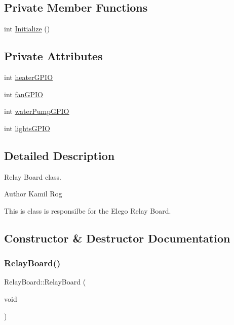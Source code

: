 \subsection*{Private Member Functions}
\begin{DoxyCompactItemize}
\item 
int \hyperlink{classRelayBoard_a49759cb3cdcb6c2ccd7fbb44eb34b260}{Initialize} ()
\end{DoxyCompactItemize}
\subsection*{Private Attributes}
\begin{DoxyCompactItemize}
\item 
int \hyperlink{classRelayBoard_a714832d9e7129960e0413b5618d2e310}{heater\+G\+P\+IO}
\item 
int \hyperlink{classRelayBoard_a70ab1391ffac8f4c01c64ba1a811b6fc}{fan\+G\+P\+IO}
\item 
int \hyperlink{classRelayBoard_a195c50d455165712f59cd39c6f7a6b82}{water\+Pump\+G\+P\+IO}
\item 
int \hyperlink{classRelayBoard_a05f68a6555288127a238e31282886ae0}{lights\+G\+P\+IO}
\end{DoxyCompactItemize}


\subsection{Detailed Description}
Relay Board class. 

\begin{DoxyAuthor}{Author}
Kamil Rog
\end{DoxyAuthor}
This is class is responsilbe for the Elego Relay Board. 

\subsection{Constructor \& Destructor Documentation}
\mbox{\label{classRelayBoard_aa788c15cfc95188f5935f9d9d9fe86d2}} 
\subsubsection{\texorpdfstring{Relay\+Board()}{RelayBoard()}}
{\footnotesize\ttfamily Relay\+Board\+::\+Relay\+Board (\begin{DoxyParamCaption}\item[{void}]{ }\end{DoxyParamCaption})\hspace{0.3cm}{\ttfamily [inline]}}



